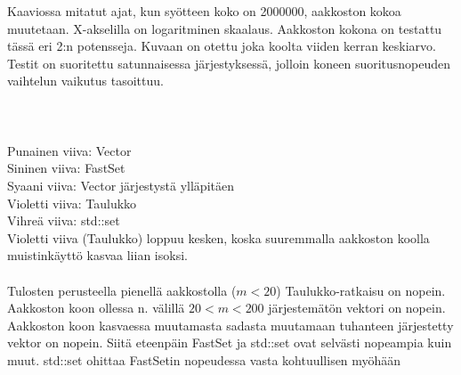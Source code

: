 \documentclass{article}
\begin{document}
            Kaaviossa mitatut ajat, kun syötteen koko on 2000000, aakkoston kokoa muutetaan. X-akselilla on logaritminen
            skaalaus. Aakkoston kokona on testattu tässä eri 2:n potensseja. Kuvaan on otettu joka koolta viiden kerran 
            keskiarvo. Testit on suoritettu satunnaisessa järjestyksessä, jolloin koneen suoritusnopeuden vaihtelun vaikutus
            tasoittuu.
            \\ \\
             \\ \\
            Punainen viiva: Vector  \\
            Sininen viiva: FastSet  \\
            Syaani viiva: Vector järjestystä ylläpitäen \\ 
            Violetti viiva: Taulukko  \\
            Vihreä viiva: std::set \\
            Violetti viiva (Taulukko) loppuu kesken, koska suuremmalla aakkoston koolla muistinkäyttö kasvaa liian isoksi.
            \\ \\
            Tulosten perusteella pienellä aakkostolla ($m<20$) Taulukko-ratkaisu on nopein. Aakkoston koon ollessa n. välillä
            $20<m<200$ järjestemätön vektori on nopein. Aakkoston koon kasvaessa muutamasta sadasta muutamaan tuhanteen järjestetty 
            vektor on nopein. Siitä eteenpäin FastSet ja std::set ovat selvästi nopeampia kuin muut. std::set ohittaa FastSetin
            nopeudessa vasta kohtuullisen myöhään
\end{document}
